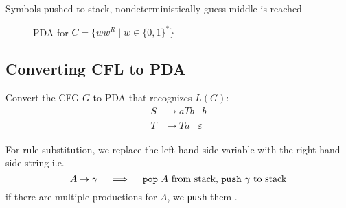 \begin{idea}
    Symbols pushed to stack, nondeterministically guess middle is reached
\end{idea}
\begin{figure}[H]
    \centering
    \caption{PDA for \(C = \{ww^R \mid w \in \{0, 1\}^*\}\)}
\end{figure}

\newpage

\subsection{Converting CFL to PDA}
\begin{eg}
    Convert the CFG \(G\) to PDA that recognizes \(L(G)\):
    \begin{align*}
        S &\to aTb \mid b \\
        T &\to Ta \mid \varepsilon
    \end{align*}
\end{eg}

\begin{idea}
    For rule substitution, we replace the left-hand side variable with the right-hand side string
    i.e. 
    \[
        A \to \gamma \quad \implies \quad \text{\texttt{pop} } A \text{ from stack, \texttt{push} } \gamma \text{ to stack}
    \]
    if there are multiple productions for \(A\), we \texttt{push} them .
\end{idea}

